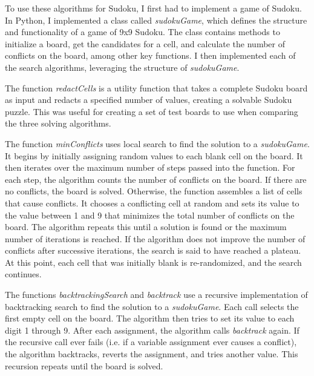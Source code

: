 \documentclass[12pt]{article}
\begin{document}
	To use these algorithms for Sudoku, I first had to implement a game of Sudoku. In Python, I implemented a class called \textit{sudokuGame}, which defines the structure and functionality of a game of 9x9 Sudoku. The class contains methods to initialize a board, get the candidates for a cell, and calculate the number of conflicts on the board, among other key functions. I then implemented each of the search algorithms, leveraging the structure of \textit{sudokuGame}.
	
	The function \textit{redactCells} is a utility function that takes a complete Sudoku board as input and redacts a specified number of values, creating a solvable Sudoku puzzle. This was useful for creating a set of test boards to use when comparing the three solving algorithms.
	
	The function \textit{\textit{minConflicts}} uses local search to find the solution to a \textit{sudokuGame}. It begins by initially assigning random values to each blank cell on the board. It then iterates over the maximum number of steps passed into the function. For each step, the algorithm counts the number of conflicts on the board. If there are no conflicts, the board is solved. Otherwise, the function assembles a list of cells that cause conflicts. It chooses a conflicting cell at random and sets its value to the value between 1 and 9 that minimizes the total number of conflicts on the board. The algorithm repeats this until a solution is found or the maximum number of iterations is reached. If the algorithm does not improve the number of conflicts after successive iterations, the search is said to have reached a plateau. At this point, each cell that was initially blank is re-randomized, and the search continues.
	
	The functions \textit{backtrackingSearch} and \textit{backtrack} use a recursive implementation of backtracking search to find the solution to a \textit{sudokuGame}. Each call selects the first empty cell on the board. The algorithm then tries to set its value to each digit 1 through 9. After each assignment, the algorithm calls \textit{backtrack} again. If the recursive call ever fails (i.e. if a variable assignment ever causes a conflict), the algorithm backtracks, reverts the assignment, and tries another value. This recursion repeats until the board is solved.
	
\end{document}
